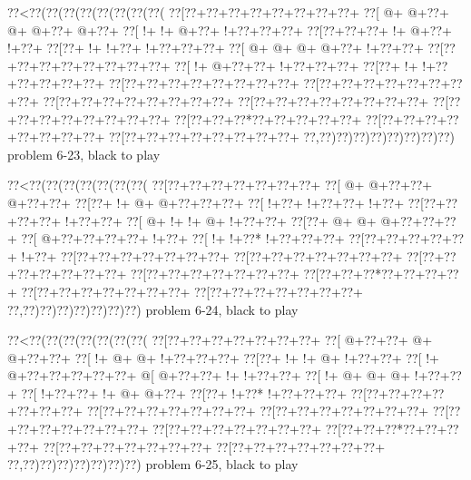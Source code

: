 \vbox{\vbox{\goo
\0??<\0??(\0??(\0??(\0??(\0??(\0??(\0??(\0??(
\0??[\0??+\0??+\0??+\0??+\0??+\0??+\0??+\0??+
\0??[\- @+\- @+\0??+\- @+\- @+\0??+\- @+\0??+
\0??[\- !+\- !+\- @+\0??+\- !+\0??+\0??+\0??+
\0??[\0??+\0??+\0??+\- !+\- @+\0??+\- !+\0??+
\0??[\0??+\- !+\- !+\0??+\- !+\0??+\0??+\0??+
\0??[\- @+\- @+\- @+\- @+\0??+\- !+\0??+\0??+
\0??[\0??+\0??+\0??+\0??+\0??+\0??+\0??+\0??+
\0??[\- !+\- @+\0??+\0??+\- !+\0??+\0??+\0??+
\0??[\0??+\- !+\- !+\0??+\0??+\0??+\0??+\0??+
\0??[\0??+\0??+\0??+\0??+\0??+\0??+\0??+\0??+
\0??[\0??+\0??+\0??+\0??+\0??+\0??+\0??+\0??+
\0??[\0??+\0??+\0??+\0??+\0??+\0??+\0??+\0??+
\0??[\0??+\0??+\0??+\0??+\0??+\0??+\0??+\0??+
\0??[\0??+\0??+\0??+\0??+\0??+\0??+\0??+\0??+
\0??[\0??+\0??+\0??*\0??+\0??+\0??+\0??+\0??+
\0??[\0??+\0??+\0??+\0??+\0??+\0??+\0??+\0??+
\0??[\0??+\0??+\0??+\0??+\0??+\0??+\0??+\0??+
\0??,\0??)\0??)\0??)\0??)\0??)\0??)\0??)\0??)
}
\hfil problem 6-23, black to play\hfil\break
}

\vbox{\vbox{\goo
\0??<\0??(\0??(\0??(\0??(\0??(\0??(\0??(
\0??[\0??+\0??+\0??+\0??+\0??+\0??+\0??+
\0??[\- @+\- @+\0??+\0??+\- @+\0??+\0??+
\0??[\0??+\- !+\- @+\- @+\0??+\0??+\0??+
\0??[\- !+\0??+\- !+\0??+\0??+\- !+\0??+
\0??[\0??+\0??+\0??+\0??+\- !+\0??+\0??+
\0??[\- @+\- !+\- !+\- @+\- !+\0??+\0??+
\0??[\0??+\- @+\- @+\- @+\0??+\0??+\0??+
\0??[\- @+\0??+\0??+\0??+\0??+\- !+\0??+
\0??[\- !+\- !+\0??*\- !+\0??+\0??+\0??+
\0??[\0??+\0??+\0??+\0??+\0??+\- !+\0??+
\0??[\0??+\0??+\0??+\0??+\0??+\0??+\0??+
\0??[\0??+\0??+\0??+\0??+\0??+\0??+\0??+
\0??[\0??+\0??+\0??+\0??+\0??+\0??+\0??+
\0??[\0??+\0??+\0??+\0??+\0??+\0??+\0??+
\0??[\0??+\0??+\0??*\0??+\0??+\0??+\0??+
\0??[\0??+\0??+\0??+\0??+\0??+\0??+\0??+
\0??[\0??+\0??+\0??+\0??+\0??+\0??+\0??+
\0??,\0??)\0??)\0??)\0??)\0??)\0??)\0??)
}
\hfil problem 6-24, black to play\hfil\break
}

\vbox{\vbox{\goo
\0??<\0??(\0??(\0??(\0??(\0??(\0??(\0??(
\0??[\0??+\0??+\0??+\0??+\0??+\0??+\0??+
\0??[\- @+\0??+\0??+\- @+\- @+\0??+\0??+
\0??[\- !+\- @+\- @+\- !+\0??+\0??+\0??+
\0??[\0??+\- !+\- !+\- @+\- !+\0??+\0??+
\0??[\- !+\- @+\0??+\0??+\0??+\0??+\0??+
\- @[\- @+\0??+\0??+\- !+\- !+\0??+\0??+
\0??[\- !+\- @+\- @+\- @+\- !+\0??+\0??+
\0??[\- !+\0??+\0??+\- !+\- @+\- @+\0??+
\0??[\0??+\- !+\0??*\- !+\0??+\0??+\0??+
\0??[\0??+\0??+\0??+\0??+\0??+\0??+\0??+
\0??[\0??+\0??+\0??+\0??+\0??+\0??+\0??+
\0??[\0??+\0??+\0??+\0??+\0??+\0??+\0??+
\0??[\0??+\0??+\0??+\0??+\0??+\0??+\0??+
\0??[\0??+\0??+\0??+\0??+\0??+\0??+\0??+
\0??[\0??+\0??+\0??*\0??+\0??+\0??+\0??+
\0??[\0??+\0??+\0??+\0??+\0??+\0??+\0??+
\0??[\0??+\0??+\0??+\0??+\0??+\0??+\0??+
\0??,\0??)\0??)\0??)\0??)\0??)\0??)\0??)
}
\hfil problem 6-25, black to play\hfil\break
}

